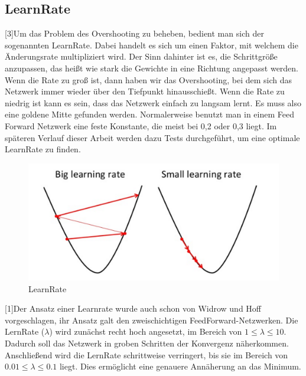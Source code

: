 \documentclass[12pt]{article}
\begin{document}
\subsection{LearnRate}[3]Um das Problem des Overshooting zu beheben, bedient man sich der sogenannten LearnRate. Dabei handelt es sich um einen Faktor, mit welchem die Änderungsrate multipliziert wird. Der Sinn dahinter ist es, die Schrittgröße anzupassen, das heißt wie stark die Gewichte in eine Richtung angepasst werden. Wenn die Rate zu groß ist, dann haben wir das Overshooting, bei dem sich das Netzwerk immer wieder über den Tiefpunkt hinausschießt. Wenn die Rate zu niedrig ist kann es sein, dass das Netzwerk einfach zu langsam lernt. Es muss also eine goldene Mitte gefunden werden. Normalerweise benutzt man in einem Feed Forward Netzwerk eine feste Konstante, die meist bei 0,2 oder 0,3 liegt. Im späteren Verlauf dieser Arbeit werden dazu Tests durchgeführt, um eine optimale LearnRate zu finden.
\begin{figure}[H]
\centering
\includegraphics[scale=0.250]{./Images/Pasted image 20230917181526.png}
\caption{LearnRate}
\label{LearnRate}
\end{figure}
[1]Der Ansatz einer Learnrate wurde auch schon von Widrow und Hoff vorgeschlagen, ihr Ansatz galt den zweischichtigen FeedForward-Netzwerken. Die LernRate ($\lambda$) wird zunächst recht hoch angesetzt, im Bereich von $1 \le \lambda \le 10$. Dadurch soll das Netzwerk in groben Schritten der Konvergenz näherkommen. Anschließend wird die LernRate schrittweise verringert, bis sie im Bereich von $0.01 \le \lambda \le 0.1$ liegt. Dies ermöglicht eine genauere Annäherung an das Minimum.
\end{document}
